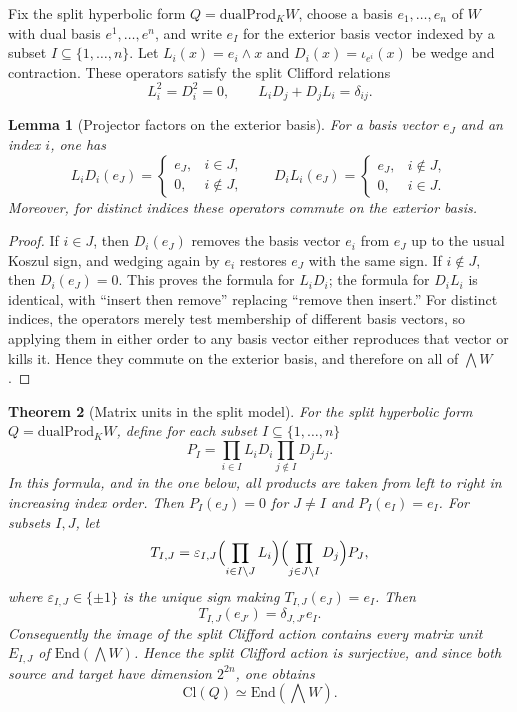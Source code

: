 \documentclass{birkjour}
\theoremstyle{plain}
\newtheorem{theorem}{Theorem}[section]
\newtheorem{lemma}[theorem]{Lemma}
\theoremstyle{definition}
\theoremstyle{remark}
\newcommand{\Cl}{\mathrm{Cl}}
\newcommand{\End}{\mathrm{End}}
\newcommand{\dualProd}{\mathrm{dualProd}}
\begin{document}
Fix the split hyperbolic form $Q=\dualProd_K W$, choose a basis
$e_1,\dots,e_n$ of $W$ with dual basis $e^1,\dots,e^n$, and write
$e_I$ for the exterior basis vector indexed by a subset
$I\subseteq \{1,\dots,n\}$. Let $L_i(x)=e_i\wedge x$ and
$D_i(x)=\iota_{e^i}(x)$ be wedge and contraction. These operators satisfy the
split Clifford relations
\[
  L_i^2=D_i^2=0,
  \qquad
  L_iD_j+D_jL_i=\delta_{ij}.
\]

\begin{lemma}[Projector factors on the exterior basis]
For a basis vector $e_J$ and an index $i$, one has
\[
  L_iD_i(e_J)=
  \begin{cases}
    e_J,& i\in J,\\
    0,& i\notin J,
  \end{cases}
  \qquad
  D_iL_i(e_J)=
  \begin{cases}
    e_J,& i\notin J,\\
    0,& i\in J.
  \end{cases}
\]
Moreover, for distinct indices these operators commute on the exterior basis.
\end{lemma}

\begin{proof}
If $i\in J$, then $D_i(e_J)$ removes the basis vector $e_i$ from $e_J$ up to
the usual Koszul sign, and wedging again by $e_i$ restores $e_J$ with the same
sign. If $i\notin J$, then $D_i(e_J)=0$. This proves the formula for $L_iD_i$;
the formula for $D_iL_i$ is identical, with ``insert then remove'' replacing
``remove then insert.'' For distinct indices, the operators merely test
membership of different basis vectors, so applying them in either order to any
basis vector either reproduces that vector or kills it. Hence they commute on
the exterior basis, and therefore on all of $\bigwedge W$.
\end{proof}

\begin{theorem}[Matrix units in the split model]
\label{thm:matrix-units-split}
For the split hyperbolic form $Q=\dualProd_K W$, define for each subset
$I\subseteq \{1,\dots,n\}$
\[
  P_I=\prod_{i\in I} L_iD_i \prod_{j\notin I} D_jL_j .
\]
In this formula, and in the one below, all products are taken from left to
right in increasing index order. Then $P_I(e_J)=0$ for $J\neq I$ and
$P_I(e_I)=e_I$. For subsets $I,J$, let
\[
  T_{I,J}=
    \varepsilon_{I,J}
    \Bigl(\prod_{i\in I\setminus J} L_i\Bigr)
    \Bigl(\prod_{j\in J\setminus I} D_j\Bigr)
    P_J,
\]
where $\varepsilon_{I,J}\in\{\pm 1\}$ is the unique sign making
$T_{I,J}(e_J)=e_I$. Then
\[
  T_{I,J}(e_{J'})=\delta_{J,J'} e_I.
\]
Consequently the image of the split Clifford action contains every matrix unit
$E_{I,J}$ of $\End(\bigwedge W)$. Hence the split Clifford action is
surjective, and since both source and target have dimension $2^{2n}$, one obtains
\[
  \Cl(Q)\simeq \End(\bigwedge W).
\]
\end{theorem}
\end{document}

